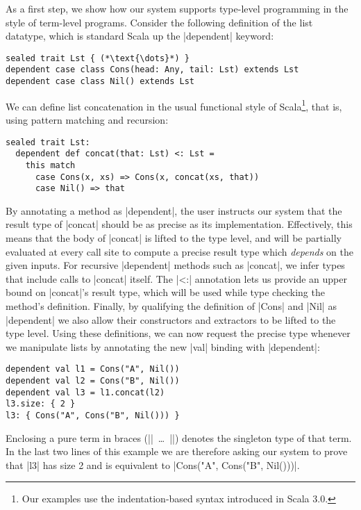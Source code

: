 As a first step, we show how our system supports type-level programming in the style of term-level programs.
Consider the following definition of the list datatype, which is standard Scala up the |dependent| keyword:

\begin{lstlisting}
sealed trait Lst { (*\text{\dots}*) }
dependent case class Cons(head: Any, tail: Lst) extends Lst
dependent case class Nil() extends Lst
\end{lstlisting}

\noindent
We can define list concatenation in the usual functional style of Scala\footnote{Our examples use the indentation-based syntax introduced in Scala 3.0.}, that is, using pattern matching and recursion:

\begin{lstlisting}
sealed trait Lst:
  dependent def concat(that: Lst) <: Lst =
    this match
      case Cons(x, xs) => Cons(x, concat(xs, that))
      case Nil() => that
\end{lstlisting}

\noindent
By annotating a method as |dependent|, the user instructs our system that the result type of |concat| should be as precise as its implementation.
Effectively, this means that the body of |concat| is lifted to the type level, and will be partially evaluated at every call site to compute a precise result type which \emph{depends} on the given inputs.
For recursive |dependent| methods such as |concat|, we infer types that include calls to |concat| itself.
The |<:| annotation lets us provide an upper bound on |concat|'s result type, which will be used while type checking the method's definition.
Finally, by qualifying the definition of |Cons| and |Nil| as |dependent| we also allow their constructors and extractors to be lifted to the type level.
Using these definitions, we can now request the precise type whenever we manipulate lists by annotating the new |val| binding with |dependent|:

\begin{lstlisting}
dependent val l1 = Cons("A", Nil())
dependent val l2 = Cons("B", Nil())
dependent val l3 = l1.concat(l2)
l3.size: { 2 }
l3: { Cons("A", Cons("B", Nil())) }
\end{lstlisting}

Enclosing a pure term in braces (|{|~\ldots{}~|}|) denotes the singleton type of that term.
In the last two lines of this example we are therefore asking our system to prove that |l3| has size 2 and is equivalent to |Cons("A", Cons("B", Nil()))|.

